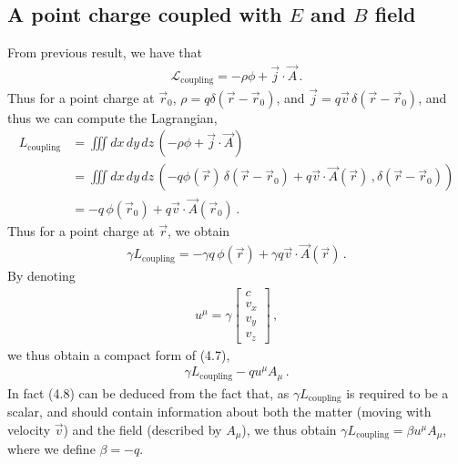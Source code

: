 \documentclass[11pt, onesided]{book}
\theoremstyle{break}
\theoremstyle{break}
\newcommand{\bmat}[1]{\begin{bmatrix} #1 \end{bmatrix}}
\begin{document}
\subsection{A point charge coupled with $E$ and $B$ field}
From previous result, we have that
\begin{align*}
\mathcal{L}_{\text{coupling}}
=-\rho \phi + \vec{j}\cdot \vec{A}\,.
\end{align*}
Thus for a point charge at $\vec{r}_0$, $\rho = q\delta(\vec{r}- \vec{r}_0)$, and $\vec{j} = q\vec{v} \, \delta(\vec{r} - \vec{r}_0)$, and thus
we can compute the Lagrangian, 
\begin{align*}
L_{\text{coupling}} 
&= \iiint dx\,dy\,dz\, (-\rho \phi + \vec{j}\cdot \vec{A})\\
&= \iiint dx\,dy\,dz\, \left(-q \phi(\vec{r})\, \delta(\vec{r} - \vec{r}_0) + q \vec{v}\cdot \vec{A}(\vec{r})\,, \delta(\vec{r} - \vec{r}_0) \right)\\
&= -q\, \phi(\vec{r}_0) + q\vec{v}\cdot \vec{A}(\vec{r}_0)\,.
\end{align*}
Thus for a point charge at $\vec{r}$, we obtain
\begin{align}
\gamma L_{\text{coupling}} = - \gamma q\, \phi(\vec{r}) + \gamma q\vec{v}\cdot \vec{A}(\vec{r})\,.
\end{align}
By denoting
\begin{align*}
u^\mu = \gamma\bmat{c \\ v_x \\ v_y \\ v_z}\,,
\end{align*}
we thus obtain a compact form of (4.7),
\begin{align}
\gamma L_{\text{coupling}}-q u^\mu A_\mu\,.
\end{align}
In fact (4.8) can be deduced from the fact that, as $\gamma L_{\text{coupling}}$ is required to be a scalar, and should contain information about both the matter (moving with velocity $\vec{v}$) and the field (described by $A_\mu$), we thus obtain $\gamma L_{\text{coupling}} = \beta u^\mu A_\mu$, where we define $\beta = -q$. \\
\end{document}
